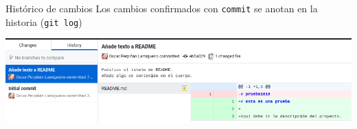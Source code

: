 \documentclass[xcolor={usenames,svgnames,dvipsnames}]{beamer}
\begin{document}
\begin{frame}[fragile,label={sec:org10f4241}]{Histórico de cambios}
 Los cambios confirmados con \texttt{commit} se anotan en la historia (\texttt{git log})

\begin{center}
\end{center}

\begin{center}
\includegraphics[width=.9\linewidth]{figs/git_history.png}
\end{center}
\end{frame}
\end{document}
